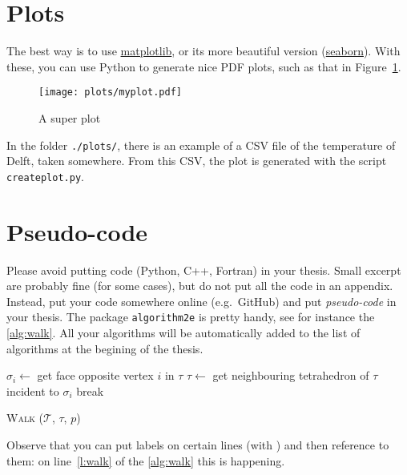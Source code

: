 \documentclass[a4paper,11pt,parskip=half]{scrartcl}
\newcommand{\eg}{e.g.}
\begin{document}
%
\section{Plots}

The best way is to use \href{http://matplotlib.org}{matplotlib}, or its more beautiful version (\href{http://stanford.edu/~mwaskom/software/seaborn/index.html}{seaborn}).
With these, you can use Python to generate nice PDF plots, such as that in Figure~\ref{fig:myplot}.
\begin{figure}
  \centering
  \texttt{[image: plots/myplot.pdf]}
  \caption{A super plot}%
\label{fig:myplot}
\end{figure}

In the folder \texttt{./plots/}, there is an example of a CSV file of the temperature of Delft, taken somewhere.
From this CSV, the plot is generated with the script \texttt{createplot.py}.


%
\section{Pseudo-code}%
\label{sec:code}

Please avoid putting code (Python, C++, Fortran) in your thesis.
Small excerpt are probably fine (for some cases), but do not put all the code in an appendix.
Instead, put your code somewhere online (\eg\ GitHub) and put \emph{pseudo-code} in your thesis.
The package \texttt{algorithm2e} is pretty handy, see for instance the \autoref{alg:walk}.
All your algorithms will be automatically added to the list of algorithms at the begining of the thesis.
\begin{algorithm}
  \BlankLine
  {
    {
      $\sigma_i \leftarrow$ get face opposite vertex $i$ in $\tau$\;
      {
        $\tau \leftarrow$ get neighbouring tetrahedron of $\tau$ incident to $\sigma_i$\;
        break\;
      }
    }  
    {
    }
  }
  \caption[W\textsc{alk}]{W\textsc{alk} ($\mathcal{T}$, $\tau$, $p$)}%
\label{alg:walk}
\end{algorithm}
Observe that you can put labels on certain lines (with \texttt{\nllabel{}}) and then reference to them: on line~\ref{l:walk} of the \autoref{alg:walk} this is happening.
\end{document}
